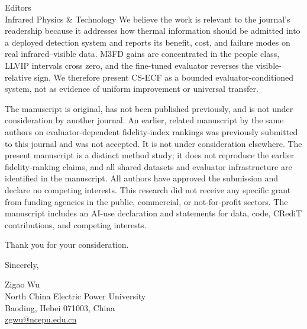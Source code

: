 \documentclass[a4paper,10pt]{letter}
\begin{document}
\begin{letter}{Editors\\Infrared Physics \& Technology}
We believe the work is relevant to the journal's readership because it addresses
how thermal information should be admitted into a deployed detection system and
reports its benefit, cost, and failure modes on real infrared--visible data.
M3FD gains are concentrated in the people class, LLVIP intervals cross zero,
and the fine-tuned evaluator reverses the visible-relative sign. We therefore
present CS-ECF as a bounded evaluator-conditioned system, not as evidence of
uniform improvement or universal transfer.

The manuscript is original, has not been published previously, and is not under
consideration by another journal. An earlier, related manuscript by the same
authors on evaluator-dependent fidelity-index rankings was previously submitted
to this journal and was not accepted. It is not under consideration elsewhere.
The present manuscript is a distinct method study; it does not reproduce the
earlier fidelity-ranking claims, and all shared datasets and evaluator
infrastructure are identified in the manuscript. All authors have approved the
submission and declare no competing interests. This research did not receive any
specific grant from funding agencies in the public, commercial, or
not-for-profit sectors. The manuscript includes an AI-use declaration and
statements for data, code, CRediT contributions, and competing interests.

Thank you for your consideration.

\closing{Sincerely,}
Zigao Wu\\
North China Electric Power University\\
Baoding, Hebei 071003, China\\
\href{mailto:zgwu@ncepu.edu.cn}{zgwu@ncepu.edu.cn}
\end{letter}
\end{document}
